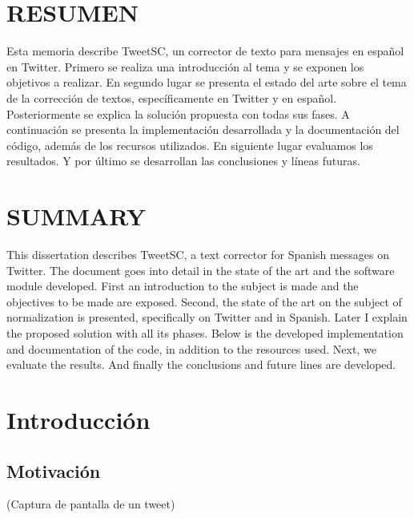 \documentclass[spanish,12pt, a4paper,twoside]{paper}
\let\oldsection\section
\def\section{\cleardoublepage\oldsection}
\newcommand\blankpage{%
    \null
    \thispagestyle{empty}%
    \addtocounter{page}{-1}%
    \newpage}
\begin{document}
\afterpage{\blankpage}

\section*{RESUMEN}
Esta memoria describe TweetSC, un corrector de texto para mensajes en español en Twitter. Primero se realiza una introducción al tema y se exponen los objetivos a realizar. En segundo lugar se presenta el estado del arte sobre el tema de la corrección de textos, específicamente en Twitter y en español. Posteriormente se explica la solución propuesta con todas sus fases. A continuación se presenta la implementación desarrollada y la documentación del código, además de los recursos utilizados. En siguiente lugar evaluamos los resultados. Y por último se desarrollan las conclusiones y líneas futuras.


\section*{SUMMARY}
This dissertation describes TweetSC, a text corrector for Spanish messages on Twitter. The document goes into detail in the state of the art and the software module developed. First an introduction to the subject is made and the objectives to be made are exposed. Second, the state of the art on the subject of normalization is presented, specifically on Twitter and in Spanish. Later I explain the proposed solution with all its phases. Below is the developed implementation and documentation of the code, in addition to the resources used. Next, we evaluate the results. And finally the conclusions and future lines are developed.


\tableofcontents %



\listoffigures
\listoftables



\newpage
{} 

\section{Introducción}\label{sec:introduccion}
\subsection{Motivación}\label{sec:motivacion}
(Captura de pantalla de un tweet)
\end{document}
